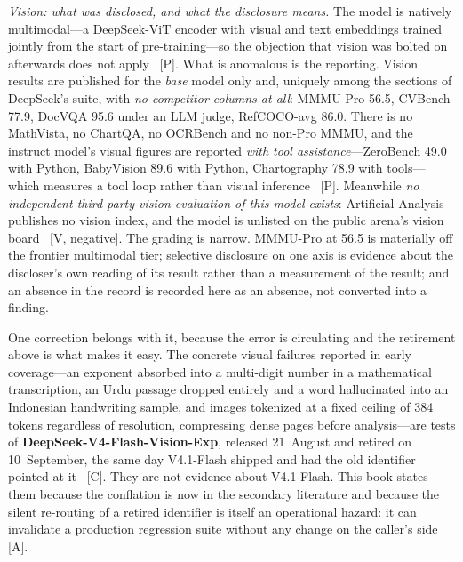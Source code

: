 \emph{Vision: what was disclosed, and what the disclosure means.} The model is natively multimodal---a DeepSeek-ViT encoder with visual and text embeddings trained jointly from the start of pre-training---so the objection that vision was bolted on afterwards does not apply~\cite{deepseek-v41flash} [P]. What is anomalous is the reporting. Vision results are published for the \emph{base} model only and, uniquely among the sections of DeepSeek's suite, with \emph{no competitor columns at all}: MMMU-Pro 56.5, CVBench 77.9, DocVQA 95.6 under an LLM judge, RefCOCO-avg 86.0. There is no MathVista, no ChartQA, no OCRBench and no non-Pro MMMU, and the instruct model's visual figures are reported \emph{with tool assistance}---ZeroBench 49.0 with Python, BabyVision 89.6 with Python, Chartography 78.9 with tools---which measures a tool loop rather than visual inference~\cite{deepseek-v41flash} [P]. Meanwhile \emph{no independent third-party vision evaluation of this model exists}: Artificial Analysis publishes no vision index, and the model is unlisted on the public arena's vision board~\cite{arena-sep26} [V, negative]. The grading is narrow. MMMU-Pro at 56.5 is materially off the frontier multimodal tier; selective disclosure on one axis is evidence about the discloser's own reading of its result rather than a measurement of the result; and an absence in the record is recorded here as an absence, not converted into a finding.

One correction belongs with it, because the error is circulating and the retirement above is what makes it easy. The concrete visual failures reported in early coverage---an exponent absorbed into a multi-digit number in a mathematical transcription, an Urdu passage dropped entirely and a word hallucinated into an Indonesian handwriting sample, and images tokenized at a fixed ceiling of 384 tokens regardless of resolution, compressing dense pages before analysis---are tests of \textbf{DeepSeek-V4-Flash-Vision-Exp}, released 21~August and retired on 10~September, the same day V4.1-Flash shipped and had the old identifier pointed at it~\cite{deepseek-v4flash-vision} [C]. They are not evidence about V4.1-Flash. This book states them because the conflation is now in the secondary literature and because the silent re-routing of a retired identifier is itself an operational hazard: it can invalidate a production regression suite without any change on the caller's side~\cite{deepseek-v41flash-vb} [A].

